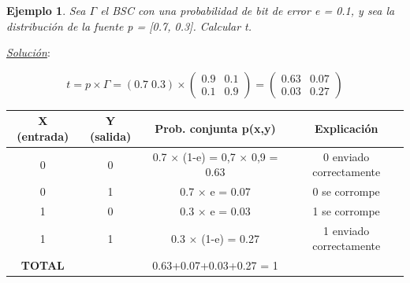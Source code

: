 \documentclass{beamer}
\theoremstyle{plain}
\theoremstyle{example}
\theoremstyle{example}
\newtheorem{ejemplo} [Ejemplo] {Ejemplo}
\begin{document}
\begin{frame}  \small 

\begin{ejemplo}

Sea $\Gamma$ el BSC con una probabilidad de bit de error  e = 0.1, y sea la distribución de la fuente p = [0.7, 0.3]. Calcular t.
\end{ejemplo}


\textit{\underline{Solución}}:\\
\vspace{0.15cm}

\footnotesize

\[
 t = p \times \Gamma = (0.7 \; 0.3) \times 
     \left( \begin{array}{cc}
           0.9       & 0.1     \\
            0.1    & 0.9      
           \end{array}
    \right) =
     \left( \begin{array}{cc}
            0.63     & 0.07     \\
            0.03    & 0.27      
           \end{array}
    \right)
\]

\begin{table}[h!]\footnotesize
    \centering
    \begin{tabular}{cccc}\hline\hline
\textbf{X (entrada)} & \textbf{Y (salida)}  & \textbf{Prob. conjunta p(x,y)} & \textbf{Explicación}\\\hline\hline
0 & 0 & 0.7 $\times$ (1-e) = 0,7 $\times$ 0,9 = 0.63   & 0 enviado correctamente \\
0 & 1 & 0.7 $\times$ e = 0.07 & 0 se corrompe \\
1 & 0 & 0.3 $\times$ e = 0.03 & 1 se corrompe \\
1 & 1 & 0.3 $\times$ (1-e) = 0.27 & 1 enviado correctamente\\\hline\hline
\textbf{TOTAL} & & 0.63+0.07+0.03+0.27 = 1 & 
    \end{tabular}

\end{table}


\end{frame} 
\end{document}
